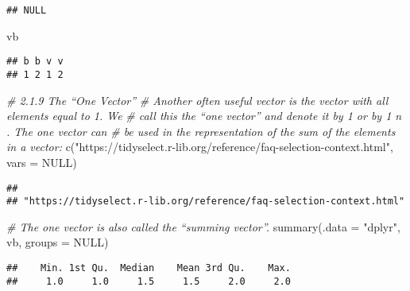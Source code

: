 \documentclass[
]{article}
\newenvironment{Shaded}{\begin{snugshade}}{\end{snugshade}}
\newcommand{\AttributeTok}[1]{\textcolor[rgb]{0.77,0.63,0.00}{#1}}
\newcommand{\CommentTok}[1]{\textcolor[rgb]{0.56,0.35,0.01}{\textit{#1}}}
\newcommand{\ConstantTok}[1]{\textcolor[rgb]{0.00,0.00,0.00}{#1}}
\newcommand{\FunctionTok}[1]{\textcolor[rgb]{0.00,0.00,0.00}{#1}}
\newcommand{\NormalTok}[1]{#1}
\newcommand{\StringTok}[1]{\textcolor[rgb]{0.31,0.60,0.02}{#1}}
\begin{document}
\begin{verbatim}
## NULL
\end{verbatim}

\begin{Shaded}
\begin{Highlighting}[]
\NormalTok{vb}
\end{Highlighting}
\end{Shaded}

\begin{verbatim}
## b b v v 
## 1 2 1 2
\end{verbatim}

\begin{Shaded}
\begin{Highlighting}[]
\CommentTok{\# 2.1.9 The “One Vector”}
\CommentTok{\# Another often useful vector is the vector with all elements equal to 1. We }
\CommentTok{\# call this the “one vector” and denote it by 1 or by 1 n . The one vector can }
\CommentTok{\# be used in the representation of the sum of the elements in a vector:}
\FunctionTok{c}\NormalTok{(}\StringTok{"https://tidyselect.r{-}lib.org/reference/faq{-}selection{-}context.html"}\NormalTok{, }
       \AttributeTok{vars =} \ConstantTok{NULL}\NormalTok{)}
\end{Highlighting}
\end{Shaded}

\begin{verbatim}
##                                                                     
## "https://tidyselect.r-lib.org/reference/faq-selection-context.html"
\end{verbatim}

\begin{Shaded}
\begin{Highlighting}[]
\CommentTok{\# The one vector is also called the “summing vector”.}
\FunctionTok{summary}\NormalTok{(}\AttributeTok{.data =} \StringTok{"dplyr"}\NormalTok{, vb, }\AttributeTok{groups =} \ConstantTok{NULL}\NormalTok{)}
\end{Highlighting}
\end{Shaded}

\begin{verbatim}
##    Min. 1st Qu.  Median    Mean 3rd Qu.    Max. 
##     1.0     1.0     1.5     1.5     2.0     2.0
\end{verbatim}
\end{document}
